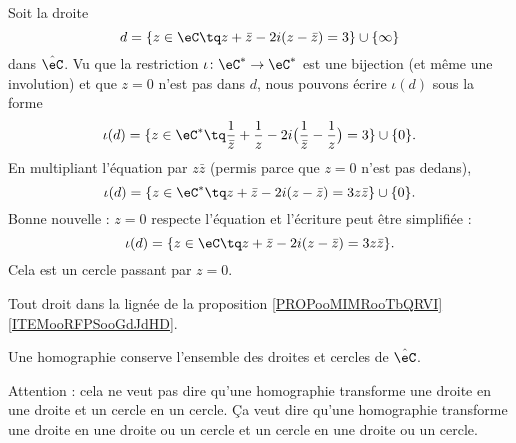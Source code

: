 \begin{example}[Inversion d'une droite ne passant pas par $ z=0$]
    Soit la droite 
    \begin{equation}
        d=\{ z\in \eC\tq z+\bar z-2i(z-\bar z)=3 \}\cup\{ \infty \}
    \end{equation}
    dans \( \hat\eC\). Vu que la restriction \( \iota\colon \eC^*\to \eC^*\) est une bijection (et même une involution) et que \( z=0\) n'est pas dans \( d\), nous pouvons écrire \( \iota(d)\) sous la forme
    \begin{equation}
        \iota(d)=\{   z\in\eC^*\tq \frac{1}{ \bar z }+\frac{1}{ z }-2i\big( \frac{1}{ \bar z }-\frac{1}{ z } \big)=3    \}\cup\{ 0 \}.
    \end{equation}
    En multipliant l'équation par \( z\bar z\) (permis parce que \( z=0\) n'est pas dedans),
    \begin{equation}
        \iota(d)=\{ z\in \eC^*\tq z+\bar z-2i(z-\bar z)=3z\bar z \}\cup\{ 0 \}.
    \end{equation}
    Bonne nouvelle : \( z=0\) respecte l'équation et l'écriture peut être simplifiée :
    \begin{equation}
        \iota(d)=\{ z\in \eC\tq z+\bar z-2i(z-\bar z)=3z\bar z \}.
    \end{equation}
    Cela est un cercle passant par \( z=0\).

    Tout droit dans la lignée de la proposition \ref{PROPooMIMRooTbQRVI}\ref{ITEMooRFPSooGdJdHD}.
\end{example}

\begin{proposition}     \label{PROPooYFJBooAWxFIs}
    Une homographie conserve l'ensemble des droites et cercles de $\hat\eC$.
\end{proposition}
Attention : cela ne veut pas dire qu'une homographie transforme une droite en une droite et un cercle en un cercle. Ça veut dire qu'une homographie transforme une droite en une droite ou un cercle et un cercle en une droite ou un cercle.

